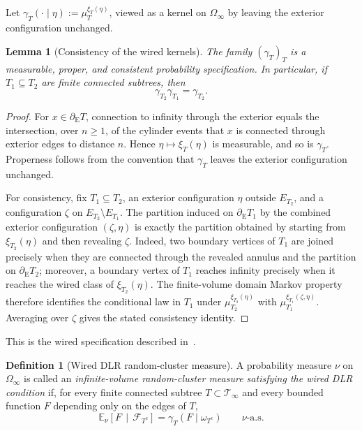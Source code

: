 \documentclass[11pt]{amsart}
\theoremstyle{plain}
\newtheorem{lemma}[theorem]{Lemma}
\theoremstyle{definition}
\newtheorem{definition}[theorem]{Definition}
\theoremstyle{remark}
\begin{document}
Let $\gamma_T(\cdot\mid\eta):=\mu_T^{\xi_T(\eta)}$, viewed as a kernel on $\Omega_\infty$ by leaving the exterior configuration unchanged.

\begin{lemma}[Consistency of the wired kernels]
\label{lem:wired-kernel-consistency}
The family $(\gamma_T)_T$ is a measurable, proper, and consistent probability specification. In particular, if $T_1\subseteq T_2$ are finite connected subtrees, then
\[
    \gamma_{T_2}\gamma_{T_1}
    =
    \gamma_{T_2}.
\]
\end{lemma}

\begin{proof}
For $x\in\partial_{\mathrm E}T$, connection to infinity through the exterior equals the intersection, over $n\ge1$, of the cylinder events that $x$ is connected through exterior edges to distance $n$. Hence $\eta\mapsto\xi_T(\eta)$ is measurable, and so is $\gamma_T$. Properness follows from the convention that $\gamma_T$ leaves the exterior configuration unchanged.

For consistency, fix $T_1\subseteq T_2$, an exterior configuration $\eta$ outside $E_{T_2}$, and a configuration $\zeta$ on $E_{T_2}\setminus E_{T_1}$. The partition induced on $\partial_{\mathrm E}T_1$ by the combined exterior configuration $(\zeta,\eta)$ is exactly the partition obtained by starting from $\xi_{T_2}(\eta)$ and then revealing $\zeta$. Indeed, two boundary vertices of $T_1$ are joined precisely when they are connected through the revealed annulus and the partition on $\partial_{\mathrm E}T_2$; moreover, a boundary vertex of $T_1$ reaches infinity precisely when it reaches the wired class of $\xi_{T_2}(\eta)$. The finite-volume domain Markov property therefore identifies the conditional law in $T_1$ under $\mu_{T_2}^{\xi_{T_2}(\eta)}$ with $\mu_{T_1}^{\xi_{T_1}(\zeta,\eta)}$. Averaging over $\zeta$ gives the stated consistency identity.
\end{proof}

This is the wired specification described in~\cite[Equation~(10.66)]{grimmett2006randomcluster}.

\begin{definition}[Wired DLR random-cluster measure]
\label{def:dlr}
A probability measure $\nu$ on $\Omega_\infty$ is called an \emph{infinite-volume random-cluster measure satisfying the wired DLR condition} if, for every finite connected subtree $T\subset\mathcal T_\infty$ and every bounded function $F$ depending only on the edges of $T$,
\[
    \mathbb E_\nu
    \left[
        F
        \,\middle|\,
        \mathcal F_{T^c}
    \right]
    =
    \gamma_T
    (F\mid\omega_{T^c})
    \qquad
    \nu\text{-a.s.}
\]
\end{definition}
\end{document}
